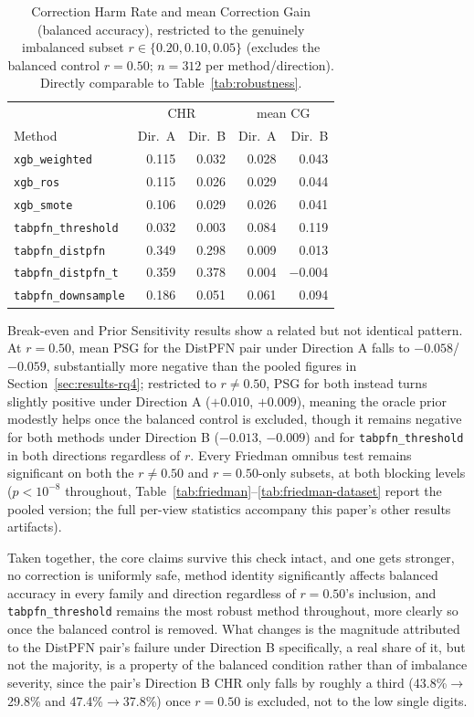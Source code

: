 \begin{table}[t]
\centering
\caption{Correction Harm Rate and mean Correction Gain (balanced
accuracy), restricted to the genuinely imbalanced subset
$r \in \{0.20, 0.10, 0.05\}$ (excludes the balanced control $r{=}0.50$;
$n{=}312$ per method/direction). Directly comparable to
Table~\ref{tab:robustness}.}
\label{tab:robustness-r050}
\begin{tabular}{@{}lrrrr@{}}
\toprule
& \multicolumn{2}{c}{CHR} & \multicolumn{2}{c}{mean CG} \\
Method & Dir.\ A & Dir.\ B & Dir.\ A & Dir.\ B \\
\midrule
\texttt{xgb\_weighted}      & 0.115 & 0.032 & 0.028 & 0.043 \\
\texttt{xgb\_ros}           & 0.115 & 0.026 & 0.029 & 0.044 \\
\texttt{xgb\_smote}         & 0.106 & 0.029 & 0.026 & 0.041 \\
\texttt{tabpfn\_threshold}  & 0.032 & 0.003 & 0.084 & 0.119 \\
\texttt{tabpfn\_distpfn}    & 0.349 & 0.298 & 0.009 & 0.013 \\
\texttt{tabpfn\_distpfn\_t} & 0.359 & 0.378 & 0.004 & $-$0.004 \\
\texttt{tabpfn\_downsample} & 0.186 & 0.051 & 0.061 & 0.094 \\
\bottomrule
\end{tabular}
\end{table}

Break-even and Prior Sensitivity results show a related but not identical
pattern. At $r{=}0.50$, mean PSG for the DistPFN pair under Direction A
falls to $-0.058$/$-0.059$, substantially more negative than the pooled
figures in Section~\ref{sec:results-rq4}; restricted to $r{\neq}0.50$, PSG
for both instead turns slightly positive under Direction A ($+0.010$,
$+0.009$), meaning the oracle prior modestly helps once the balanced
control is excluded, though it remains negative for both methods under
Direction B ($-0.013$, $-0.009$) and for \texttt{tabpfn\_threshold} in
both directions regardless of $r$. Every Friedman omnibus test remains
significant on both the $r{\neq}0.50$ and $r{=}0.50$-only subsets, at both
blocking levels ($p<10^{-8}$ throughout,
Table~\ref{tab:friedman}--\ref{tab:friedman-dataset} report the pooled
version; the full per-view statistics accompany this paper's other
results artifacts).

Taken together, the core claims survive this check intact, and one gets
stronger, no correction is uniformly safe, method identity significantly
affects balanced accuracy in every family and direction regardless of
$r{=}0.50$'s inclusion, and \texttt{tabpfn\_threshold} remains the most
robust method throughout, more clearly so once the balanced control is
removed. What changes is the magnitude attributed to the DistPFN pair's
failure under Direction B specifically, a real share of it, but not the
majority, is a property of the balanced condition rather than of
imbalance severity, since the pair's Direction B CHR only falls by
roughly a third (43.8\%$\to$29.8\% and 47.4\%$\to$37.8\%) once $r{=}0.50$
is excluded, not to the low single digits.

